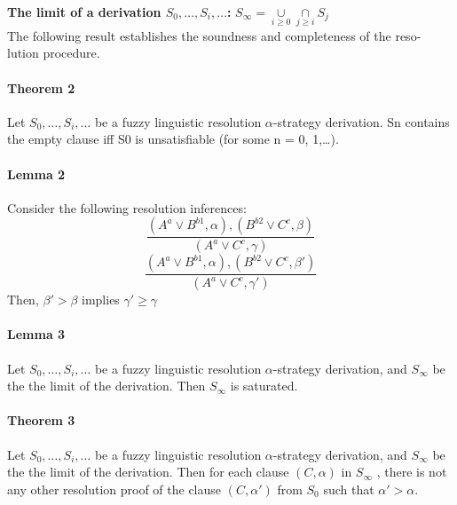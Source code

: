\documentclass[part1.tex]{subfiles}
\begin{document}
\paragraph{} 
{\bfseries The limit of a derivation $S_{0},\ldots,S_{i},\ldots$:} 
$S_{\infty} = \underset{i \ge 0}{\cup} \underset{j \ge i}{\cap}S_{j}$
\\
The following result establishes the soundness and completeness of the reso-
lution procedure.
\paragraph{Theorem 2}
Let $S_{0},\ldots,S_{i},\ldots$ be a fuzzy linguistic resolution $\alpha$-strategy derivation.
Sn contains the empty clause iff S0 is unsatisfiable (for some n = 0, 1,\ldots).
\paragraph{Lemma 2} 
Consider the following resolution inferences:
\[ \frac{(A^{a} \vee B^{b1}, \alpha), (B^{b2} \vee C^{c}, \beta)} {(A^{a} \vee C^{c}, \gamma)}\]
\[\frac{(A^{a} \vee B^{b1}, \alpha), (B^{b2} \vee C^{c}, \beta')} {(A^{a} \vee C^{c}, \gamma')}\]
Then, $\beta' > \beta$ implies $\gamma' \ge \gamma$

\paragraph{Lemma 3} Let $S_{0},\ldots,S_{i},\ldots$ be a fuzzy linguistic 
resolution $\alpha$-strategy derivation, and $S_{\infty}$ be the the limit of the derivation.
Then $S_{\infty}$ is saturated.

\paragraph{Theorem 3} Let $S_{0},\ldots,S_{i},\ldots$ be a fuzzy linguistic 
resolution $\alpha$-strategy derivation, and $S_{\infty}$ be the the limit of the derivation. 
Then for each clause $(C, \alpha)$ in $S_{\infty}$ , there is not any other resolution proof 
of the clause $(C, \alpha')$ from $S_{0}$ such that $\alpha' > \alpha$.
\end{document}
